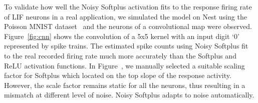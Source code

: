 	To validate how well the Noisy Softplus activation fits to the response firing rate of LIF neurons in a real application, we simulated the model on Nest using the Poisson MNIST dataset~\cite{liu2016bench} and the neurons of a convolutional map were observed.
	Figure~\ref{fig:cnn} shows the convolution of a 5x5 kernel with an input digit `0' represented by spike trains.
	The estimated spike counts using Noisy Softplus fit to the real recorded firing rate much more accurately than the Softplus and ReLU activation functions.
	In Figure~, we manually selected a suitable scaling factor for Softplus which located on the top slope of the response activity.
	However, the scale factor remains static for all the neurons, thus resulting in a mismatch at different level of noise.
	Noisy Softplus adapts to noise automatically.
	
	
	

